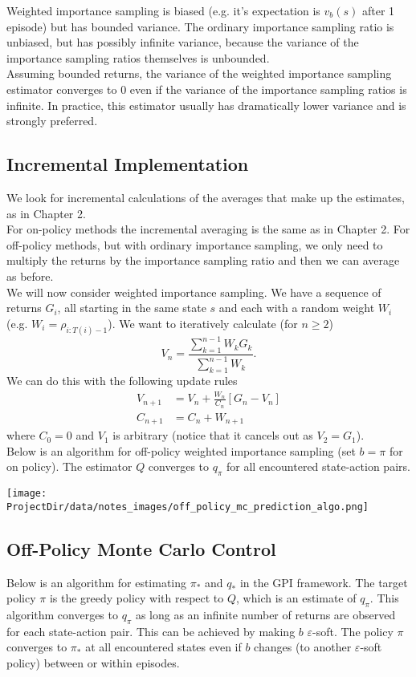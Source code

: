 Weighted importance sampling is biased (e.g. it's expectation is $v_b(s)$ after 1 episode) but has bounded variance. The ordinary importance sampling ratio is unbiased, but has possibly infinite variance, because the variance of the importance sampling ratios themselves is unbounded.\\

Assuming bounded returns, the variance of the weighted importance sampling estimator converges to 0 even if the variance of the importance sampling ratios is infinite. In practice, this estimator usually has dramatically lower variance and is strongly preferred.

\subsection{Incremental Implementation}
We look for incremental calculations of the averages that make up the estimates, as in Chapter 2.\\

For on-policy methods the incremental averaging is the same as in Chapter 2. For off-policy methods, but with ordinary importance sampling, we only need to multiply the returns by the importance sampling ratio and then we can average as before.\\

We will now consider weighted importance sampling. We have a sequence of returns $G_i$, all starting in the same state $s$ and each with a random weight $W_i$ (e.g. $W_i = \rho_{i:T(i)-1}$). We want to iteratively calculate (for $n \geq 2$)
\[
    V_n = \frac{\sum_{k=1}^{n-1}W_kG_k}{\sum_{k=1}^{n-1}W_k}.
\]
We can do this with the following update rules
\begin{align}
    V_{n+1} &= V_n + \frac{W_n}{C_n}[G_n - V_n]\\
    C_{n+1} &= C_n + W_{n+1}
\end{align}
where $C_0 = 0$ and $V_1$ is arbitrary (notice that it cancels out as $V_2 = G_1$).\\

Below is an algorithm for off-policy weighted importance sampling (set $b=\pi$ for on policy). The estimator $Q$ converges to $q_\pi$ for all encountered state-action pairs.

\texttt{[image: \\ProjectDir/data/notes\_images/off\_policy\_mc\_prediction\_algo.png]}


\subsection{Off-Policy Monte Carlo Control}
Below is an algorithm for estimating $\pi_*$ and $q_*$ in the GPI framework. The target policy $\pi$ is the greedy policy with respect to $Q$, which is an estimate of $q_\pi$. This algorithm converges to $q_\pi$ as long as an infinite number of returns are observed for each state-action pair. This can be achieved by making $b$ $\varepsilon$-soft. The policy $\pi$ converges to $\pi_*$ at all encountered states even if $b$ changes (to another $\varepsilon$-soft policy) between or within episodes.


